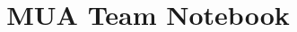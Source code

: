 \documentclass[9pt, a4paper, landscape]{article}
\title{\vspace{-4ex}\Large{MUA Team Notebook}}
\author{}
\date{}
\begin{document}
\begin{multicols}{2}

\maketitle
\vspace{-13ex}
\tableofcontents
\pagestyle{fancy}






\end{multicols}
\end{document}
